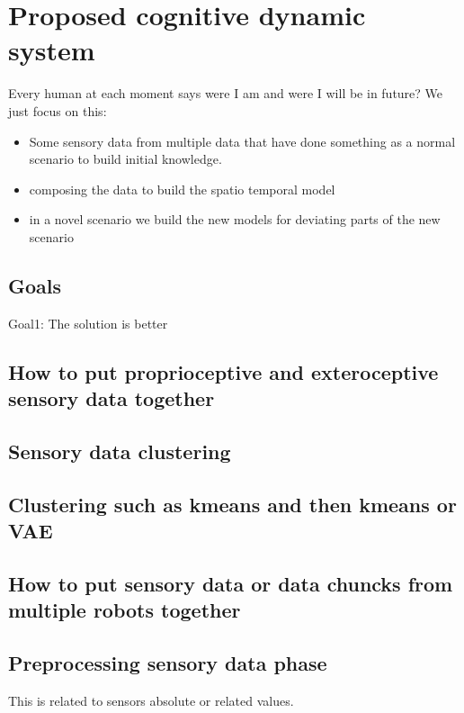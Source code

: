 \chapter{Proposed cognitive dynamic system}
Every human at each moment says were I am and were I will be in future?
We just focus on this: 
\begin{itemize}
    \item Some sensory data from multiple data that have done something as a normal scenario to build initial knowledge. 
    \item composing the data to build the spatio temporal model
    \item in a novel scenario we build the new models for deviating parts of the new scenario
\end{itemize}


\section{Goals}
Goal1: The solution is better

\section{How to put proprioceptive and exteroceptive sensory data together}
    

\section{Sensory data clustering}
    \section{Clustering such as kmeans and then kmeans or VAE}

\section{How to put sensory data or data chuncks from multiple robots together}

\section{Preprocessing sensory data phase}
     This is related to sensors absolute or related values. 
    

